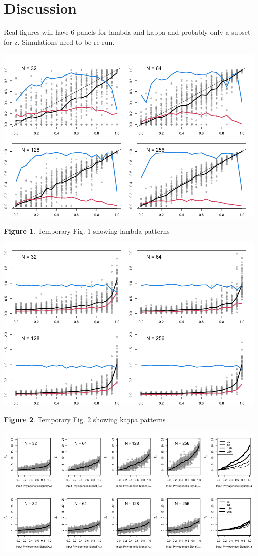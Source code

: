 \documentclass[]{article}
\begin{document}
\hypertarget{discussion}{%
\section{Discussion}\label{discussion}}

\newpage

Real figures will have 6 panels for lambda and kappa and probably only a
subset for z. Simulations need to be re-run.

\includegraphics[width=0.95\linewidth]{new.fig.1.temp}

\singlespacing \textbf{Figure 1}. Temporary Fig. 1 showing lambda
patterns

\newpage

\includegraphics[width=0.95\linewidth]{new.fig.2.temp}

\singlespacing \textbf{Figure 2}. Temporary Fig. 2 showing kappa
patterns

\newpage

\includegraphics[width=0.95\linewidth]{new.fig.3.temp}
\end{document}
